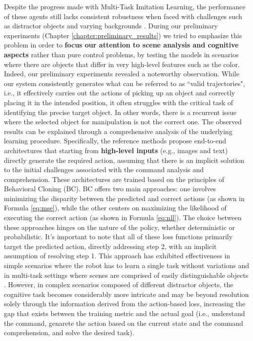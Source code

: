 Despite the progress made with Multi-Task Imitation Learning, the performance of these agents still lacks consistent robustness when faced with challenges such as distractor objects and varying backgrounds \cite{brohan2022rt}. During our preliminary experiments (Chapter \ref{chapter:preliminary_results}) we tried to emphasize this problem in order to \textbf{focus our attention to scene analysis and cognitive aspects} rather than pure control problems, by testing the models in scenarios where there are objects that differ in very high-level features such as the color. Indeed, our preliminary experiments revealed a noteworthy observation. While our system consistently generates what can be referred to as ``valid trajectories", i.e., it effectively carries out the actions of picking up an object and correctly placing it in the intended position, it often struggles with the critical task of identifying the precise target object. In other words, there is a recurrent issue where the selected object for manipulation is not the correct one.
\newline The observed results can be explained through a comprehensive analysis of the underlying learning procedure. Specifically, the reference methods \cite{dasari2021transformers_one_shot,mandi2022towards_more_generalizable_one_shot,brohan2022rt} propose end-to-end architectures that starting from \textbf{high-level inputs} (e.g., images and text) directly generate the required action, assuming that there is an implicit solution to the initial challenges associated with the command analysis and comprehension. These architectures are trained based on the principles of Behavioral Cloning (BC). BC offers two main approaches: one involves minimizing the disparity between the predicted and correct actions (as shown in Formula \ref{eq:mse}), while the other centers on maximizing the likelihood of executing the correct action (as shown in Formula \ref{eq:nll}). The choice between these approaches hinges on the nature of the policy, whether deterministic or probabilistic. It's important to note that all of these loss functions primarily target the predicted action, directly addressing step 2, with an implicit assumption of resolving step 1. This approach has exhibited effectiveness in simple scenarios where the robot has to learn a single task without variations \cite{zhang2018deep_vr_teleoperation,duan2017one_shot_il} and in multi-task settings where scenes are comprised of easily distinguishable objects \cite{dasari2021transformers_one_shot,mandi2022towards_more_generalizable_one_shot,brohan2022rt}. However, in complex scenarios composed of different distractor objects, the cognitive task becomes considerably more intricate and may be beyond resolution solely through the information derived from the action-based loss, increasing the gap that exists between the training metric and the actual goal (i.e., understand the command, genarete the action based on the current state and the command comprehension, and solve the desired task).
